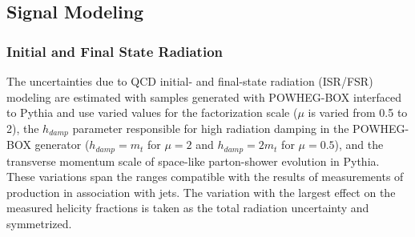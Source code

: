 \subsection{Signal Modeling}
\label{sec:ttH_PS}

\subsubsection{Initial and Final State Radiation}
The uncertainties due to QCD initial- and final-state radiation (ISR/FSR) modeling are estimated with samples generated with
{\sc POWHEG-BOX} interfaced to {\sc Pythia} and use varied values for the factorization scale ($\mu$ is varied from 0.5 to 2), 
the $h_{damp}$ parameter responsible for high \pt radiation damping in the {\sc POWHEG-BOX} generator ($h_{damp}=m_{t}$ for 
$\mu=2$ and $h_{damp}=2m_{t}$ for $\mu=0.5$), and the transverse momentum scale of space-like parton-shower evolution in 
{\sc Pythia}. These variations span the ranges compatible  with the results of measurements of \ttbar production in association with 
jets. The variation with the largest effect on the measured helicity fractions is taken as the total radiation uncertainty and symmetrized.


